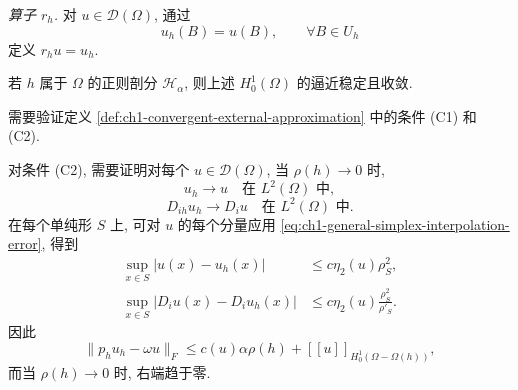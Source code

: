 \emph{算子 $r_h$.} 对 $u\in\mathcal D(\Omega)$, 通过
\begin{equation}
u_h(B)=u(B),
\qquad\forall B\in U_h
\label{eq:ch1-nc-point-restriction}
\end{equation}
定义 $r_hu=u_h$.

\begin{Proposition}
\label{prop:ch1-nc-h01-stable-convergent}
若 $h$ 属于 $\Omega$ 的正则剖分 $\mathcal H_\alpha$, 则上述 $H_0^1(\Omega)$ 的逼近稳定且收敛.
\end{Proposition}

\begin{Proof}
需要验证定义 \ref{def:ch1-convergent-external-approximation} 中的条件 (C1) 和 (C2).

对条件 (C2), 需要证明对每个 $u\in\mathcal D(\Omega)$, 当 $\rho(h)\to0$ 时,
\begin{equation}
u_h\longrightarrow u
\quad\text{在 }L^2(\Omega)\text{ 中},
\label{eq:ch1-nc-l2-convergence}
\end{equation}
\begin{equation}
D_{ih}u_h\longrightarrow D_iu
\quad\text{在 }L^2(\Omega)\text{ 中}.
\label{eq:ch1-nc-derivative-convergence}
\end{equation}
在每个单纯形 $S$ 上, 可对 $u$ 的每个分量应用 \eqref{eq:ch1-general-simplex-interpolation-error}, 得到
\begin{equation}
\begin{aligned}
\sup_{x\in S}|u(x)-u_h(x)|&\leq c\eta_2(u)\rho_S^2,\\
\sup_{x\in S}|D_iu(x)-D_iu_h(x)|
&\leq c\eta_2(u)\frac{\rho_S^2}{\rho'_S}.
\end{aligned}
\label{eq:ch1-nc-local-interpolation-error}
\end{equation}
因此
\begin{equation}
\|p_hu_h-\omega u\|_F
\leq c(u)\alpha\rho(h)+[[u]]_{H_0^1(\Omega-\Omega(h))},
\label{eq:ch1-nc-global-interpolation-error}
\end{equation}
而当 $\rho(h)\to0$ 时, 右端趋于零.


\end{Proof}
